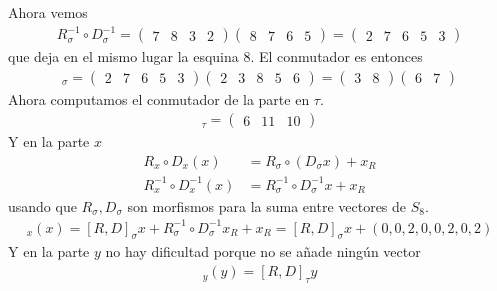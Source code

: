\documentclass{article}
\theoremstyle{definition}
\begin{document}
Ahora vemos
\begin{align*}
    R_\sigma^{-1}\circ D_\sigma^{-1}=\begin{pmatrix}
                                         7 & 8 & 3 & 2
                                     \end{pmatrix}\begin{pmatrix}
                                                      8 & 7 & 6 & 5
                                                  \end{pmatrix}=
    \begin{pmatrix}
        2 & 7 & 6 & 5 & 3
    \end{pmatrix}
\end{align*}
que deja en el mismo lugar la esquina $8$. El conmutador es entonces
\begin{align*}
    [R,D]_\sigma=\begin{pmatrix}
                     2 & 7 & 6 & 5 & 3
                 \end{pmatrix}\begin{pmatrix}
                                  2 & 3 & 8 & 5 & 6
                              \end{pmatrix}
    =\begin{pmatrix}
         3 & 8
     \end{pmatrix}\begin{pmatrix}
                      6 & 7
                  \end{pmatrix}
\end{align*}
Ahora computamos el conmutador de la parte en $\tau$.
\begin{align*}
    [R,D]_\tau=\begin{pmatrix}
                   6 & 11 & 10
               \end{pmatrix}
\end{align*}
Y en la parte $x$
\begin{align*}
    R_x\circ D_x(x)           & =R_\sigma \circ (D_\sigma x)+x_R         \\
    R_x^{-1}\circ D_x^{-1}(x) & =R_{\sigma}^{-1}\circ D_\sigma^{-1}x+x_R
\end{align*}
usando que $R_\sigma,D_\sigma$ son morfismos para la suma entre vectores de $S_8$.
\begin{align*}
    [R,D]_x(x)=[R,D]_\sigma x+R_\sigma^{-1}\circ D_{\sigma}^{-1}x_R+x_R=[R,D]_\sigma x+(0,0,2,0,0,2,0,2)
\end{align*}
Y en la parte $y$ no hay dificultad porque no se añade ningún vector
\begin{align*}
    [R,D]_y(y)=[R,D]_\tau y
\end{align*}
\end{document}
